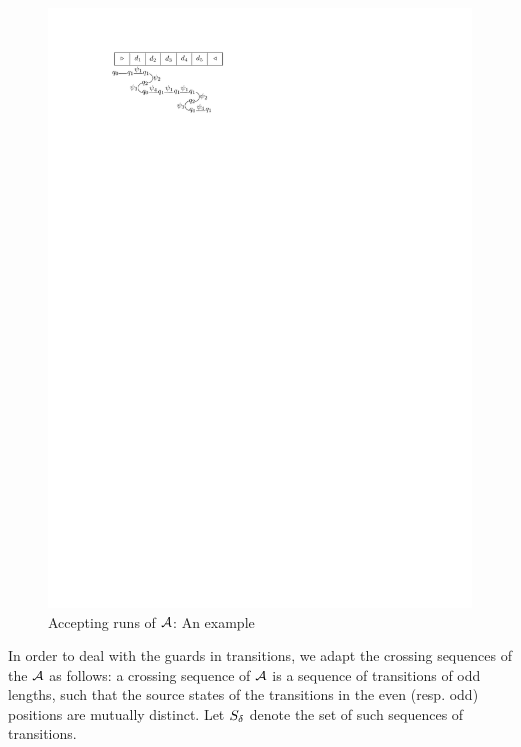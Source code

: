 \begin{figure}[htbp]
\begin{center}
\includegraphics{2sa-sa-exmp.pdf}
\end{center}
\caption{Accepting runs of $\mathcal{A}$: An example}\label{fig-2sa-sa}
\end{figure}

In order to deal with the guards in transitions, we adapt the crossing sequences of the \SSA{} $\mathcal{A}$  as follows: a crossing sequence of $\mathcal{A}$ is a sequence of transitions of odd lengths, such that  the source states of the transitions in the even (resp. odd) positions are mutually distinct. Let $S_{\delta}$ denote the set of such sequences of transitions.


\newcommand\lmatch{\mathsf{LeftMatch}}
\newcommand\rmatch{\mathsf{RightMatch}}

